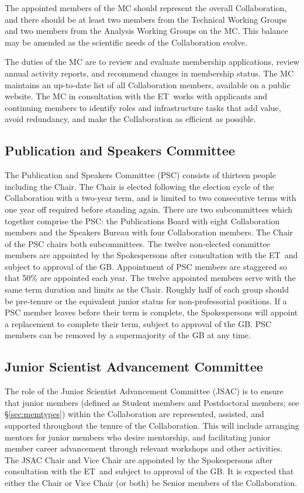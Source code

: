 \documentclass[12pt]{article}
\newcommand{\exec}{{Executive Team}}
\newcommand{\shorte}{{ET}}  %
\begin{document}
The appointed members of the MC should represent the overall Collaboration, and there should be at least two members from the Technical Working Groups and two members from the Analysis Working Groups on the MC.  This balance may be amended as the scientific needs of the Collaboration evolve. 

The duties of the MC  are to review and evaluate membership applications, review annual activity reports, and recommend changes in membership status. The MC maintains an up-to-date list of all Collaboration members, available on a public website.  The MC in consultation with the \shorte\ works with applicants and continuing members to identify roles and infrastructure tasks that add value, avoid redundancy, and make the Collaboration as efficient as possible.

\subsection{Publication and Speakers  Committee}
\label{sec:pubcouncil}

The Publication and Speakers Committee (PSC) consists of thirteen people including the Chair. The Chair is elected following the election cycle of the Collaboration with a two-year term, and is limited to two consecutive terms with one year off required before standing again. There are two subcommittees which together comprise the PSC: the Publications Board with eight Collaboration members and the Speakers Bureau with four Collaboration members. The Chair of the PSC chairs both subcommittees. The twelve non-elected committee members are appointed by the Spokespersons after consultation with the \shorte\ and subject to approval of the GB. Appointment of PSC members are staggered so that 50\% are appointed each year. The twelve appointed members serve with the same term duration and limits as the Chair. Roughly half of each group should be pre-tenure or the equivalent junior status for non-professorial positions. If a PSC member leaves before their term is complete, the Spokespersons
will appoint a replacement to complete their term, subject to approval of the GB. PSC members can be removed by a supermajority of the GB at any time.  

\subsection{Junior Scientist Advancement Committee}

The role of the Junior Scientist Advancement Committee (JSAC) is to ensure that junior members (defined as Student members and Postdoctoral members; see \S\ref{sec:memtypes}) within the Collaboration are represented, assisted, and supported throughout the  tenure of the Collaboration. This will include arranging mentors for junior members who desire mentorship, and facilitating junior member career advancement through relevant workshops and other activities. The JSAC Chair and Vice Chair are appointed by the Spokespersons after consultation with the \shorte\ and subject to approval of the GB. It is expected that either the Chair or Vice Chair (or both) be Senior members of the Collaboration.
\end{document}
